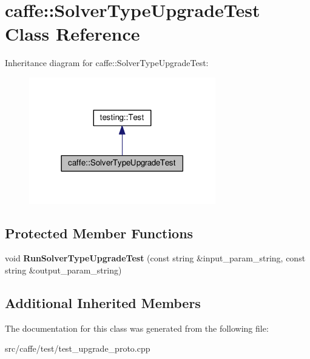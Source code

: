 \hypertarget{classcaffe_1_1_solver_type_upgrade_test}{}\section{caffe\+:\+:Solver\+Type\+Upgrade\+Test Class Reference}
\label{classcaffe_1_1_solver_type_upgrade_test}


Inheritance diagram for caffe\+:\+:Solver\+Type\+Upgrade\+Test\+:
\nopagebreak
\begin{figure}[H]
\begin{center}
\leavevmode
\includegraphics[width=230pt]{classcaffe_1_1_solver_type_upgrade_test__inherit__graph}
\end{center}
\end{figure}
\subsection*{Protected Member Functions}
\begin{DoxyCompactItemize}
\item 
\mbox{\label{classcaffe_1_1_solver_type_upgrade_test_a55efa661a4e090b4810f0c274401948b}} 
void {\bfseries Run\+Solver\+Type\+Upgrade\+Test} (const string \&input\+\_\+param\+\_\+string, const string \&output\+\_\+param\+\_\+string)
\end{DoxyCompactItemize}
\subsection*{Additional Inherited Members}


The documentation for this class was generated from the following file\+:\begin{DoxyCompactItemize}
\item 
src/caffe/test/test\+\_\+upgrade\+\_\+proto.\+cpp\end{DoxyCompactItemize}

